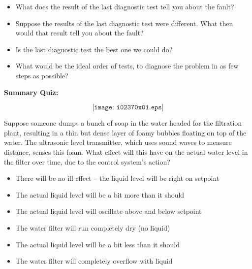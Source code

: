 \begin{itemize}
\item{} What does the result of the last diagnostic test tell you about the fault?
\item{} Suppose the results of the last diagnostic test were different.  What then would that result tell you about the fault?
\item{} Is the last diagnostic test the best one we could do?
\item{} What would be the ideal order of tests, to diagnose the problem in as few steps as possible?
\end{itemize}












\vfil \eject

\noindent
{\bf Summary Quiz:}

$$\texttt{[image: i02370x01.eps]}$$

Suppose someone dumps a bunch of soap in the water headed for the filtration plant, resulting in a thin but dense layer of foamy bubbles floating on top of the water.  The ultrasonic level transmitter, which uses sound waves to measure distance, senses this foam.  What effect will this have on the actual water level in the filter over time, due to the control system's action?

\begin{itemize}
\item{} There will be no ill effect -- the liquid level will be right on setpoint
\vskip 5pt 
\item{} The actual liquid level will be a bit more than it should
\vskip 5pt 
\item{} The actual liquid level will oscillate above and below setpoint
\vskip 5pt 
\item{} The water filter will run completely dry (no liquid)
\vskip 5pt 
\item{} The actual liquid level will be a bit less than it should
\vskip 5pt 
\item{} The water filter will completely overflow with liquid
\end{itemize}






